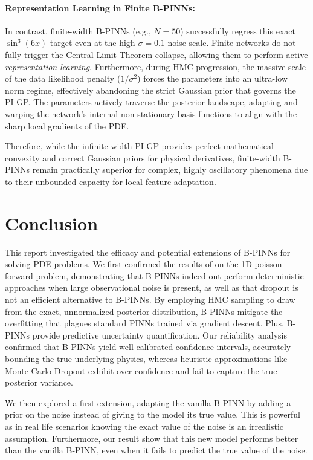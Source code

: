 \documentclass{article}
\begin{document}
\paragraph{Representation Learning in Finite B-PINNs:}
In contrast, finite-width B-PINNs (e.g., $N=50$) successfully regress this exact $\sin^3(6x)$ target even at the high $\sigma = 0.1$ noise scale. Finite networks do not fully trigger the Central Limit Theorem collapse, allowing them to perform active \emph{representation learning}. Furthermore, during HMC progression, the massive scale of the data likelihood penalty ($1/\sigma^2$) forces the parameters into an ultra-low norm regime, effectively abandoning the strict Gaussian prior that governs the PI-GP. The parameters actively traverse the posterior landscape, adapting and warping the network's internal non-stationary basis functions to align with the sharp local gradients of the PDE.

Therefore, while the infinite-width PI-GP provides perfect mathematical convexity and correct Gaussian priors for physical derivatives, finite-width B-PINNs remain practically superior for complex, highly oscillatory phenomena due to their unbounded capacity for local feature adaptation.



\section{Conclusion}

This report investigated the efficacy and potential extensions of B-PINNs for solving PDE problems.
We first confirmed the results of \cite{Yang_2021} on the 1D poisson forward problem, demonstrating that B-PINNs indeed out-perform deterministic approaches when large observational noise is present, as well as that dropout is not an efficient alternative to B-PINNs.  By employing HMC sampling to draw from the exact, unnormalized posterior distribution, B-PINNs mitigate the overfitting that plagues standard PINNs trained via gradient descent. Plus, B-PINNs provide predictive uncertainty quantification. Our reliability analysis confirmed that B-PINNs yield well-calibrated confidence intervals, accurately bounding the true underlying physics, whereas heuristic approximations like Monte Carlo Dropout exhibit over-confidence and fail to capture the true posterior variance.

We then explored a first extension, adapting the vanilla B-PINN by adding a prior on the noise instead of giving to the model its true value. This is powerful as in real life scenarios knowing the exact value of the noise is an irrealistic assumption. Furthermore, our result show that this new model performs better than the vanilla B-PINN, even when it fails to predict the true value of the noise. 
\end{document}
